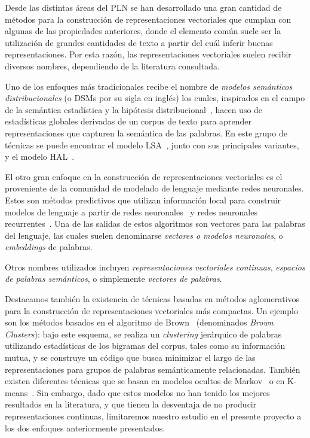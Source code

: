 Desde las distintas áreas del PLN se han desarrollado una gran cantidad de métodos para la
construcción de representaciones vectoriales que cumplan con algunas de las propiedades anteriores,
donde el elemento común suele ser la utilización de grandes cantidades de texto a partir del cuál
inferir buenas representaciones. Por esta razón, las representaciones vectoriales suelen recibir
diversos nombres, dependiendo de la literatura consultada.

Uno de los enfoques más tradicionales recibe el nombre de \textit{modelos semánticos
distribucionales} (o DSMs por su sigla en inglés) los cuales, inspirados en el campo de la semántica
estadística y la hipótesis distribucional~\cite{Harris1954}, hacen uso de estadísticas globales
derivadas de un corpus de texto para aprender representaciones que capturen la semántica de las
palabras. En este grupo de técnicas se puede encontrar el modelo LSA~\cite{Dumais1988,
Deerwester1990}, junto con sus principales variantes, y el modelo HAL~\cite{Lund1995,
LundBurgess1996}.

El otro gran enfoque en la construcción de representaciones vectoriales es el proveniente de la
comunidad de modelado de lenguaje mediante redes neuronales. Estos son métodos predictivos que
utilizan información local para construir modelos de lenguaje a partir de redes
neuronales~\cite{Bengio2003} y redes neuronales recurrentes~\cite{Mikolov2010}. Una de las salidas
de estos algoritmos son vectores para las palabras del lenguaje, las cuales suelen denominarse
\textit{vectores o modelos neuronales}, o \textit{embeddings} de palabras.

Otros nombres utilizados incluyen \textit{representaciones vectoriales continuas}, \textit{espacios
de palabras semánticos}, o simplemente \textit{vectores de palabras}.

Destacamos también la existencia de técnicas basadas en métodos aglomerativos para la construcción
de representaciones vectoriales más compactas. Un ejemplo son los métodos basados en el algoritmo de
Brown~\cite{Brown1992} (denominados \textit{Brown Clusters}): bajo este esquema, se realiza un
\textit{clustering} jerárquico de palabras utilizando estadísticas de los bigramas del corpus, tales
como su información mutua, y se construye un código que busca minimizar el largo de las
representaciones para grupos de palabras semánticamente relacionadas. También existen diferentes
técnicas que se basan en modelos ocultos de Markov~\cite{LiMcCallum2005} o en
K-means~\cite{LinWu2009}. Sin embargo, dado que estos modelos no han tenido los mejores resultados
en la literatura, y que tienen la desventaja de no producir representaciones continuas, limitaremos
nuestro estudio en el presente proyecto a los dos enfoques anteriormente presentados.


